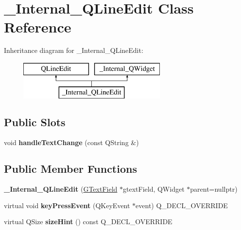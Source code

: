 \hypertarget{class__Internal__QLineEdit}{}\section{\+\_\+\+Internal\+\_\+\+Q\+Line\+Edit Class Reference}
\label{class__Internal__QLineEdit}
Inheritance diagram for \+\_\+\+Internal\+\_\+\+Q\+Line\+Edit\+:\begin{figure}[H]
\begin{center}
\leavevmode
\includegraphics[height=2.000000cm]{class__Internal__QLineEdit}
\end{center}
\end{figure}
\subsection*{Public Slots}
\begin{DoxyCompactItemize}
\item 
\mbox{\label{class__Internal__QLineEdit_ad24656b82adba695684f7ba0cf50676d}} 
void {\bfseries handle\+Text\+Change} (const Q\+String \&)
\end{DoxyCompactItemize}
\subsection*{Public Member Functions}
\begin{DoxyCompactItemize}
\item 
\mbox{\label{class__Internal__QLineEdit_af4b95ac8d9a7027c89e8ab9294e54a67}} 
{\bfseries \+\_\+\+Internal\+\_\+\+Q\+Line\+Edit} (\mbox{\hyperlink{classGTextField}{G\+Text\+Field}} $\ast$gtext\+Field, Q\+Widget $\ast$parent=nullptr)
\item 
\mbox{\label{class__Internal__QLineEdit_ab1e491361fa49780caaf4001c8623c52}} 
virtual void {\bfseries key\+Press\+Event} (Q\+Key\+Event $\ast$event) Q\+\_\+\+D\+E\+C\+L\+\_\+\+O\+V\+E\+R\+R\+I\+DE
\item 
\mbox{\label{class__Internal__QLineEdit_a2d3d09154d682ed641960bf6f89d2b78}} 
virtual Q\+Size {\bfseries size\+Hint} () const Q\+\_\+\+D\+E\+C\+L\+\_\+\+O\+V\+E\+R\+R\+I\+DE
\end{DoxyCompactItemize}



